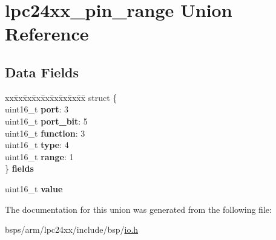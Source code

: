 \hypertarget{unionlpc24xx__pin__range}{}\section{lpc24xx\+\_\+pin\+\_\+range Union Reference}
\label{unionlpc24xx__pin__range}
\subsection*{Data Fields}
\begin{DoxyCompactItemize}
\item 
\mbox{\label{unionlpc24xx__pin__range_a6ff01fb893b1c537043784197d5d7c93}} 
\begin{tabbing}
xx\=xx\=xx\=xx\=xx\=xx\=xx\=xx\=xx\=\kill
struct \{\\
\>uint16\_t {\bfseries port}: 3\\
\>uint16\_t {\bfseries port\_bit}: 5\\
\>uint16\_t {\bfseries function}: 3\\
\>uint16\_t {\bfseries type}: 4\\
\>uint16\_t {\bfseries range}: 1\\
\} {\bfseries fields}\\

\end{tabbing}\item 
\mbox{\label{unionlpc24xx__pin__range_af3eefa2b69909bffb770251a2e50a1c6}} 
uint16\+\_\+t {\bfseries value}
\end{DoxyCompactItemize}


The documentation for this union was generated from the following file\+:\begin{DoxyCompactItemize}
\item 
bsps/arm/lpc24xx/include/bsp/\mbox{\hyperlink{bsps_2arm_2lpc24xx_2include_2bsp_2io_8h}{io.\+h}}\end{DoxyCompactItemize}
